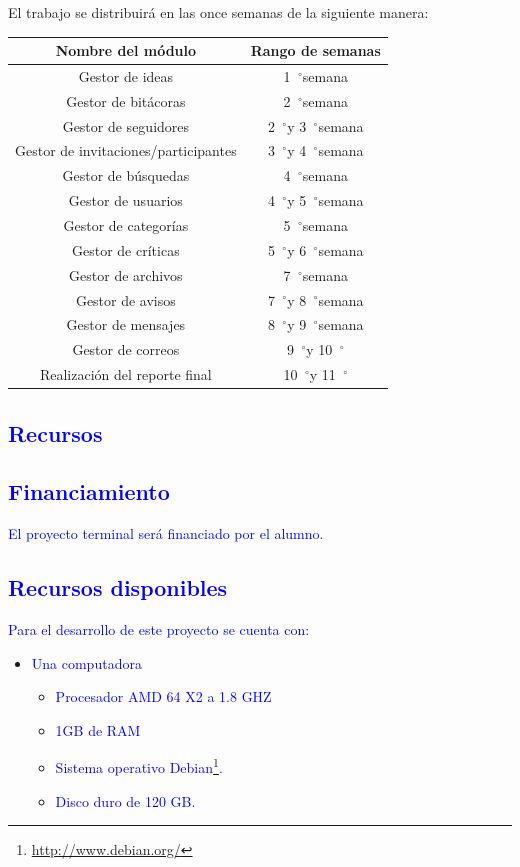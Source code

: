 \documentclass[11pt,letterpaper,titlepage]{article}
\newcommand{\grad}{\hspace{-2mm}$\phantom{a}^{\circ}$}
\begin{document}
El trabajo se distribuir\'a en las once semanas de la siguiente manera:

\begin{center}
\begin{tabular}{|c|c|}\hline
Nombre del m\'odulo & Rango de semanas\\ \hline\hline
Gestor de ideas&1\grad semana \\ \hline
Gestor de bit\'acoras&2\grad semana \\ \hline
Gestor de seguidores&2\grad y 3\grad semana\\ \hline
Gestor de invitaciones/participantes&3\grad y 4\grad semana \\ \hline
Gestor de b\'usquedas&4\grad semana \\ \hline
Gestor de usuarios&4\grad y 5\grad semana \\ \hline
Gestor de categor\'ias&5\grad semana \\ \hline
Gestor de cr\'iticas&5\grad y 6\grad semana \\ \hline
Gestor de archivos&7\grad semana\\ \hline
Gestor de avisos&7\grad y 8\grad semana\\ \hline
Gestor de mensajes&8\grad y 9\grad semana\\ \hline
Gestor de correos&9\grad y 10\grad \\ \hline
Realizaci\'on del reporte final&10\grad y 11\grad \\ \hline
\end{tabular}
\end{center}

\textcolor{blue}{
\section{Recursos}
\subsection{Financiamiento}
El proyecto terminal ser\'a financiado por el alumno.
\subsection{Recursos disponibles}
Para el desarrollo de este proyecto se cuenta con:}
\begin{itemize}
 \item \textcolor{blue}{Una computadora}
  \begin{itemize}
   \item \textcolor{blue}{Procesador AMD 64 X2  a 1.8 GHZ }
   \item \textcolor{blue}{1GB de RAM}
   \item \textcolor{blue}{Sistema operativo Debian\footnote{\href{http://www.debian.org/}{http://www.debian.org/}}.}
   \item \textcolor{blue}{Disco duro de 120 GB.}
  \end{itemize}

\end{itemize}
\end{document}
